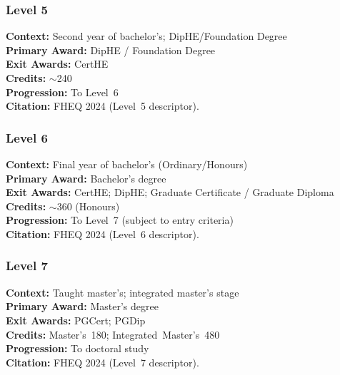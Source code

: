 \subsubsection*{Level 5}

\begin{tcolorbox}
\textbf{Context:} Second year of bachelor's; DipHE/Foundation Degree \\
\textbf{Primary Award:} DipHE / Foundation Degree \\
\textbf{Exit Awards:} CertHE \\
\textbf{Credits:} $\sim$240 \\
\textbf{Progression:} To Level~6 \\
\textbf{Citation:} FHEQ 2024 (Level~5 descriptor).
\end{tcolorbox}

\subsubsection*{Level 6}

\begin{tcolorbox}
\textbf{Context:} Final year of bachelor's (Ordinary/Honours) \\
\textbf{Primary Award:} Bachelor's degree \\
\textbf{Exit Awards:} CertHE; DipHE; Graduate Certificate / Graduate Diploma \\
\textbf{Credits:} $\sim$360 (Honours) \\
\textbf{Progression:} To Level~7 (subject to entry criteria) \\
\textbf{Citation:} FHEQ 2024 (Level~6 descriptor).
\end{tcolorbox}

\subsubsection*{Level 7}

\begin{tcolorbox}
\textbf{Context:} Taught master's; integrated master's stage \\
\textbf{Primary Award:} Master's degree \\
\textbf{Exit Awards:} PGCert; PGDip \\
\textbf{Credits:} Master’s~180; Integrated~Master’s~480 \\
\textbf{Progression:} To doctoral study \\
\textbf{Citation:} FHEQ 2024 (Level~7 descriptor).
\end{tcolorbox}

